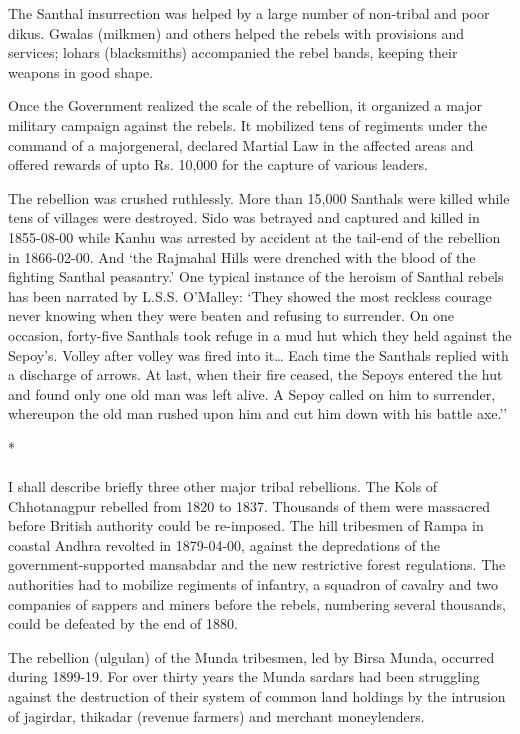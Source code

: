 The Santhal insurrection was helped by a large number of non-tribal and poor dikus. Gwalas (milkmen) and others helped the rebels with provisions and services; lohars (blacksmiths) accompanied the rebel bands, keeping their weapons in good shape.

Once the Government realized the scale of the rebellion, it organized a major military campaign against the rebels. It mobilized tens of regiments under the command of a major­general, declared Martial Law in the affected areas and offered rewards of upto Rs. 10,000 for the capture of various leaders.

The rebellion was crushed ruthlessly. More than 15,000 Santhals were killed while tens of villages were destroyed. Sido was betrayed and captured and killed in 1855-08-00 while Kanhu was arrested by accident at the tail-end of the rebellion in 1866-02-00. And `the Rajmahal Hills were drenched with the blood of the fighting Santhal peasantry.' One typical instance of the heroism of Santhal rebels has been narrated by L.S.S. O'Malley: `They showed the most reckless courage never knowing when they were beaten and refusing to surrender. On one occasion, forty-five Santhals took refuge in a mud hut which they held against the Sepoy's. Volley after volley was fired into it… Each time the Santhals replied with a discharge of arrows. At last, when their fire ceased, the Sepoys entered the hut and found only one old man was left alive. A Sepoy called on him to surrender, whereupon the old man rushed upon him and cut him down with his battle axe.''

\begin{center}*\end{center}

\paragraph*{}
I shall describe briefly three other major tribal rebellions. The Kols of Chhotanagpur rebelled from 1820 to 1837. Thousands of them were massacred before British authority could be re-imposed. The hill tribesmen of Rampa in coastal Andhra revolted in 1879-04-00, against the depredations of the government-supported mansabdar and the new restrictive forest regulations. The authorities had to mobilize regiments of infantry, a squadron of cavalry and two companies of sappers and miners before the rebels, numbering several thousands, could be defeated by the end of 1880.

The rebellion (ulgulan) of the Munda tribesmen, led by Birsa Munda, occurred during 1899-19. For over thirty years the Munda sardars had been struggling against the destruction of their system of common land holdings by the intrusion of jagirdar, thikadar (revenue farmers) and merchant moneylenders.


